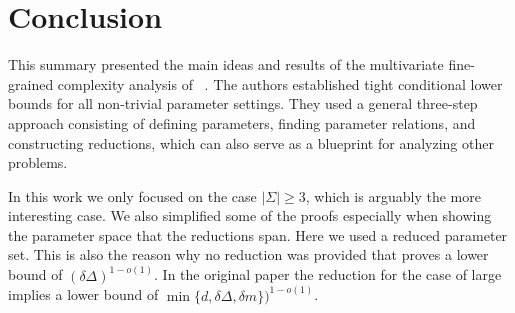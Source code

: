 \section{Conclusion}
This summary presented the main ideas and results of the multivariate fine-grained complexity analysis of \lcs{}~\cite{Bringman.2018}.  
The authors established tight conditional lower bounds for all non-trivial parameter settings.
They used a general three-step approach consisting of defining parameters, finding parameter relations, and constructing reductions, which can also serve as a blueprint for analyzing other problems.  

In this work we only focused on the case $|\Sigma| \geq 3$, which is arguably the more interesting case.
We also simplified some of the proofs especially when showing the parameter space that the reductions span.
Here we used a reduced parameter set.
This is also the reason why no reduction was provided that proves a lower bound of $(\delta \Delta)^{1-o(1)}$.
In the original paper the reduction for the case of large \lcs{} implies a lower bound of $\min\{d, \delta \Delta, \delta m\})^{1 - o(1)}$.


